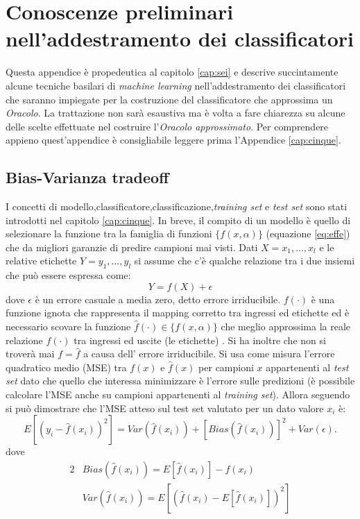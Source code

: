  
 
 
 
 
 
 
 
 \chapter[Prel. add.  class.]{Conoscenze preliminari nell'addestramento dei classificatori}
\label{app:tre}
Questa appendice è propedeutica al capitolo \ref{cap:sei} e descrive succintamente alcune tecniche basilari di \textit{machine learning}  nell'addestramento dei classificatori che saranno impiegate per la costruzione del classificatore che approssima un \textit{Oracolo}. La trattazione non sarà esaustiva ma è volta a fare chiarezza su alcune delle scelte effettuate nel costruire l'\textit{Oracolo approssimato}. Per comprendere appieno quest'appendice è consigliabile leggere prima l'Appendice \ref{cap:cinque}.

\section{Bias-Varianza tradeoff}
I concetti di modello,classificatore,classificazione,\textit{training set} e \textit{test set} sono stati introdotti nel capitolo \ref{cap:cinque}. In breve,  il compito di un modello è quello di selezionare la funzione tra la famiglia di funzioni $\{f(x,\alpha)\}$ (equazione \eqref{eq:effe}) che da migliori garanzie di predire campioni mai visti. Dati $X=x_1,\dots,x_l$ e le relative etichette $Y=y_1,\dots,y_l$ si assume che c'è qualche relazione tra i due insiemi che può essere espressa come:
\begin{equation}
Y = f(X) + \epsilon
\end{equation}
dove $\epsilon$ è un errore casuale a media zero, detto errore irriducibile.
$f(\cdot)$ è una funzione ignota che rappresenta il mapping corretto tra ingressi ed etichette ed è necessario scovare la funzione $\hat{f}(\cdot) \in \{f(x,\alpha)\}$ che meglio approssima la reale relazione $f(\cdot)$ tra ingressi ed uscite (le etichette) . Si ha inoltre che non si troverà mai $f=\hat{f}$ a causa dell' errore irriducibile. Si usa come misura l'errore quadratico medio (MSE) tra $f(x) \text{ e }\hat{f}(x)$ per campioni $x$ appartenenti al \textit{test set} dato che quello che interessa minimizzare è l'errore sulle predizioni (è possibile calcolare l'MSE anche su campioni appartenenti al \textit{training set}). Allora seguendo \cite{Trevor09} si può dimostrare che l'MSE atteso sul test set valutato per un dato valore $x_i$ è:
\begin{equation}
E[( y_i − \hat{f}(x_i) )^2] = Var( \hat{f}(x_i)) + [Bias( \hat{f}(x_i))]^2 + Var(\epsilon). 
\end{equation}  
 dove 
 \begin{alignat*}{2}
&Bias( \hat{f}(x_i)) = E[\hat{f}(x_i)] - f(x_i) \\
 &Var( \hat{f}(x_i)) = E[(\hat{f}(x_i) - E[\hat{f}(x_i)])^2]
\end{alignat*}

